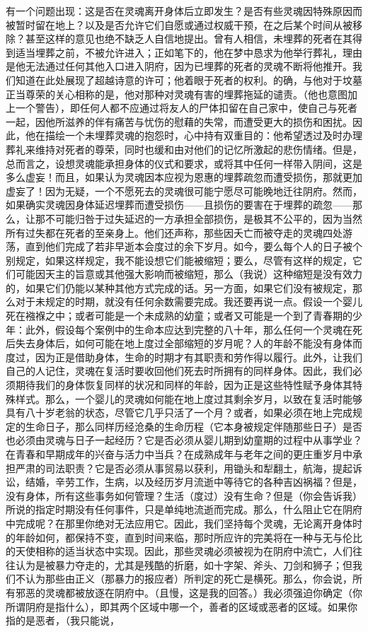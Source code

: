 有一个问题出现：这是否在灵魂离开身体后立即发生？是否有些灵魂因特殊原因而被暂时留在地上？以及是否允许它们自愿或通过权威干预，在之后某个时间从被移除？甚至这样的意见也绝不缺乏人自信地提出。曾有人相信，未埋葬的死者在其得到适当埋葬之前，不被允许进入；正如笔下的，他在梦中恳求为他举行葬礼，理由是他无法通过任何其他入口进入阴府，因为已埋葬的死者的灵魂不断将他推开。我们知道在此处展现了超越诗意的许可；他着眼于死者的权利。的确，与他对于坟墓正当尊荣的关心相称的是，他对那种对灵魂有害的埋葬拖延的谴责。（他也意图加上一个警告），即任何人都不应通过将友人的尸体扣留在自己家中，使自己与死者一起，因他所滋养的伴有痛苦与忧伤的慰藉的失常，而遭受更大的损伤和困扰。因此，他在描绘一个未埋葬灵魂的抱怨时，心中持有双重目的：他希望透过及时办理葬礼来维持对死者的尊荣，同时也缓和由对他们的记忆所激起的悲伤情绪。但是，总而言之，设想灵魂能承担身体的仪式和要求，或将其中任何一样带入阴间，这是多么虚妄！而且，如果认为灵魂因本应视为恩惠的埋葬疏忽而遭受损伤，那就更加虚妄了！因为无疑，一个不愿死去的灵魂很可能宁愿尽可能晚地迁往阴府。然而，如果确实灵魂因身体延迟埋葬而遭受损伤——且损伤的要害在于埋葬的疏忽——那么，让那不可能归咎于过失延迟的一方承担全部损伤，是极其不公平的，因为当然所有过失都在死者的至亲身上。他们还声称，那些因夭亡而被夺走的灵魂四处游荡，直到他们完成了若非早逝本会度过的余下岁月。如今，要么每个人的日子被个别规定，如果这样规定，我不能设想它们能被缩短；要么，尽管有这样的规定，它们可能因天主的旨意或其他强大影响而被缩短，那么（我说）这种缩短是没有效力的，如果它们仍能以某种其他方式完成的话。另一方面，如果它们没有被规定，那么对于未规定的时期，就没有任何余数需要完成。我还要再说一点。假设一个婴儿死在襁褓之中；或者可能是一个未成熟的幼童；或者又可能是一个到了青春期的少年：此外，假设每个案例中的生命本应达到完整的八十年，那么任何一个灵魂在死后失去身体后，如何可能在地上度过全部缩短的岁月呢？人的年龄不能没有身体而度过，因为正是借助身体，生命的时期才有其职责和劳作得以履行。此外，让我们自己的人记住，灵魂在复活时要收回他们死去时所拥有的同样身体。因此，我们必须期待我们的身体恢复同样的状况和同样的年龄，因为正是这些特性赋予身体其特殊样式。那么，一个婴儿的灵魂如何能在地上度过其剩余岁月，以致在复活时能够具有八十岁老翁的状态，尽管它几乎只活了一个月？或者，如果必须在地上完成规定的生命日子，那么同样历经沧桑的生命历程（它本身被规定伴随那些日子）是否也必须由灵魂与日子一起经历？它是否必须从婴儿期到幼童期的过程中从事学业？在青春和早期成年的兴奋与活力中当兵？在成熟成年与老年之间的更庄重岁月中承担严肃的司法职责？它是否必须从事贸易以获利，用锄头和犁翻土，航海，提起诉讼，结婚，辛劳工作，生病，以及经历岁月流逝中等待它的各种吉凶祸福？但是，没有身体，所有这些事务如何管理？生活（度过）没有生命？但是（你会告诉我）所说的指定时期没有任何事件，只是单纯地流逝而完成。那么，什么阻止它在阴府中完成呢？在那里你绝对无法应用它。因此，我们坚持每个灵魂，无论离开身体时的年龄如何，都保持不变，直到时间来临，那时所应许的完美将在一种与无与伦比的天使相称的适当状态中实现。因此，那些灵魂必须被视为在阴府中流亡，人们往往认为是被暴力夺走的，尤其是残酷的折磨，如十字架、斧头、刀剑和狮子；但我们不认为那些由正义（那暴力的报应者）所判定的死亡是横死。那么，你会说，所有邪恶的灵魂都被放逐在阴府中。（且慢，这是我的回答。）我必须强迫你确定（你所谓阴府是指什么），即其两个区域中哪一个，善者的区域或恶者的区域。如果你指的是恶者，（我只能说，